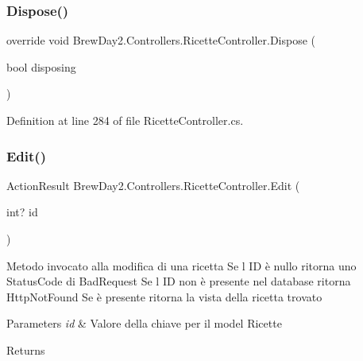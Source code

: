 \subsubsection{\texorpdfstring{Dispose()}{Dispose()}}
{\footnotesize\ttfamily override void Brew\+Day2.\+Controllers.\+Ricette\+Controller.\+Dispose (\begin{DoxyParamCaption}\item[{bool}]{disposing }\end{DoxyParamCaption})\hspace{0.3cm}{\ttfamily [protected]}}



Definition at line 284 of file Ricette\+Controller.\+cs.

\mbox{\label{class_brew_day2_1_1_controllers_1_1_ricette_controller_a3e04796b2bacf85d21c27df282326a30}} 
\subsubsection{\texorpdfstring{Edit()}{Edit()}\hspace{0.1cm}{\footnotesize\ttfamily [1/2]}}
{\footnotesize\ttfamily Action\+Result Brew\+Day2.\+Controllers.\+Ricette\+Controller.\+Edit (\begin{DoxyParamCaption}\item[{int?}]{id }\end{DoxyParamCaption})}



Metodo invocato alla modifica di una ricetta Se l\textquotesingle{} ID è nullo ritorna uno Status\+Code di Bad\+Request Se l\textquotesingle{} ID non è presente nel database ritorna Http\+Not\+Found Se è presente ritorna la vista della ricetta trovato 
\begin{DoxyParams}{Parameters}
{\em id} & Valore della chiave per il model Ricette\\
\hline
\end{DoxyParams}
\begin{DoxyReturn}{Returns}

\end{DoxyReturn}




